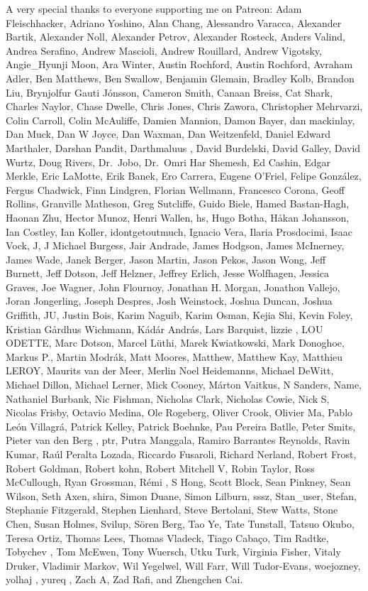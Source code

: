 \documentclass[
  letterpaper,
  DIV=11,
  numbers=noendperiod]{scrartcl}
\begin{document}
A very special thanks to everyone supporting me on Patreon: Adam
Fleischhacker, Adriano Yoshino, Alan Chang, Alessandro Varacca,
Alexander Bartik, Alexander Noll, Alexander Petrov, Alexander Rosteck,
Anders Valind, Andrea Serafino, Andrew Mascioli, Andrew Rouillard,
Andrew Vigotsky, Angie\_Hyunji Moon, Ara Winter, Austin Rochford, Austin
Rochford, Avraham Adler, Ben Matthews, Ben Swallow, Benjamin Glemain,
Bradley Kolb, Brandon Liu, Brynjolfur Gauti Jónsson, Cameron Smith,
Canaan Breiss, Cat Shark, Charles Naylor, Chase Dwelle, Chris Jones,
Chris Zawora, Christopher Mehrvarzi, Colin Carroll, Colin McAuliffe,
Damien Mannion, Damon Bayer, dan mackinlay, Dan Muck, Dan W Joyce, Dan
Waxman, Dan Weitzenfeld, Daniel Edward Marthaler, Darshan Pandit,
Darthmaluus , David Burdelski, David Galley, David Wurtz, Doug Rivers,
Dr.~Jobo, Dr.~Omri Har Shemesh, Ed Cashin, Edgar Merkle, Eric LaMotte,
Erik Banek, Ero Carrera, Eugene O'Friel, Felipe González, Fergus
Chadwick, Finn Lindgren, Florian Wellmann, Francesco Corona, Geoff
Rollins, Granville Matheson, Greg Sutcliffe, Guido Biele, Hamed
Bastan-Hagh, Haonan Zhu, Hector Munoz, Henri Wallen, hs, Hugo Botha,
Håkan Johansson, Ian Costley, Ian Koller, idontgetoutmuch, Ignacio Vera,
Ilaria Prosdocimi, Isaac Vock, J, J Michael Burgess, Jair Andrade, James
Hodgson, James McInerney, James Wade, Janek Berger, Jason Martin, Jason
Pekos, Jason Wong, Jeff Burnett, Jeff Dotson, Jeff Helzner, Jeffrey
Erlich, Jesse Wolfhagen, Jessica Graves, Joe Wagner, John Flournoy,
Jonathan H. Morgan, Jonathon Vallejo, Joran Jongerling, Joseph Despres,
Josh Weinstock, Joshua Duncan, Joshua Griffith, JU, Justin Bois, Karim
Naguib, Karim Osman, Kejia Shi, Kevin Foley, Kristian Gårdhus Wichmann,
Kádár András, Lars Barquist, lizzie , LOU ODETTE, Marc Dotson, Marcel
Lüthi, Marek Kwiatkowski, Mark Donoghoe, Markus P., Martin Modrák, Matt
Moores, Matthew, Matthew Kay, Matthieu LEROY, Maurits van der Meer,
Merlin Noel Heidemanns, Michael DeWitt, Michael Dillon, Michael Lerner,
Mick Cooney, Márton Vaitkus, N Sanders, Name, Nathaniel Burbank, Nic
Fishman, Nicholas Clark, Nicholas Cowie, Nick S, Nicolas Frisby, Octavio
Medina, Ole Rogeberg, Oliver Crook, Olivier Ma, Pablo León Villagrá,
Patrick Kelley, Patrick Boehnke, Pau Pereira Batlle, Peter Smits, Pieter
van den Berg , ptr, Putra Manggala, Ramiro Barrantes Reynolds, Ravin
Kumar, Raúl Peralta Lozada, Riccardo Fusaroli, Richard Nerland, Robert
Frost, Robert Goldman, Robert kohn, Robert Mitchell V, Robin Taylor,
Ross McCullough, Ryan Grossman, Rémi , S Hong, Scott Block, Sean
Pinkney, Sean Wilson, Seth Axen, shira, Simon Duane, Simon Lilburn,
sssz, Stan\_user, Stefan, Stephanie Fitzgerald, Stephen Lienhard, Steve
Bertolani, Stew Watts, Stone Chen, Susan Holmes, Svilup, Sören Berg, Tao
Ye, Tate Tunstall, Tatsuo Okubo, Teresa Ortiz, Thomas Lees, Thomas
Vladeck, Tiago Cabaço, Tim Radtke, Tobychev , Tom McEwen, Tony Wuersch,
Utku Turk, Virginia Fisher, Vitaly Druker, Vladimir Markov, Wil
Yegelwel, Will Farr, Will Tudor-Evans, woejozney, yolhaj , yureq , Zach
A, Zad Rafi, and Zhengchen Cai.
\end{document}
